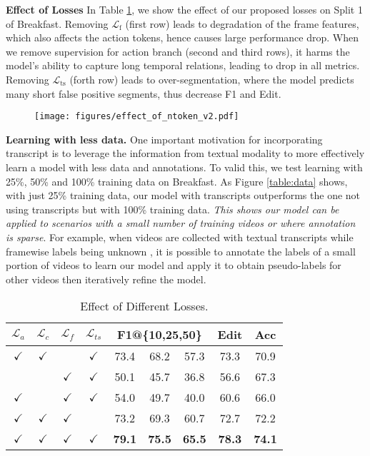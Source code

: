 \documentclass[10pt,twocolumn,letterpaper]{article}
\newcommand{\headline}[1]{\noindent \textbf{#1}}
\newcommand{\mL}{\mathcal{L}}
\newcommand{\0}{\boldsymbol{0}}
\begin{document}
\headline{Effect of Losses}
In Table \ref{table:losses}, we show the effect of our proposed losses on Split 1 of Breakfast. 
Removing $\mL_\text{f}$ (first row) leads to degradation of the frame features, which also affects the action tokens, hence causes large performance drop.  
When we remove supervision for action branch (second and third rows), it harms the model's ability to capture long temporal relations, leading to drop in all metrics.
Removing $\mL_\text{ts}$ (forth row) leads to over-segmentation, where the model predicts many short false positive segments, thus decrease F1 and Edit.



\begin{figure}
   \centering
   \texttt{[image: figures/effect\_of\_ntoken\_v2.pdf]}
   \label{fig:action-token}
\end{figure}

\headline{Learning with less data.}
One important motivation for incorporating transcript is to leverage the information from textual modality to more effectively learn a model with less data and annotations. To valid this, we test learning with 25\%, 50\% and 100\% training data on Breakfast. As Figure \ref{table:data} shows, with just 25\% training data, our model with transcripts outperforms the one not using transcripts but with 100\% training data. \emph{This shows our model can be applied to scenarios with a small number of training videos or where annotation is sparse}. 
For example, when videos are collected with textual transcripts while framewise labels being unknown \cite{Richard-Viterbi:CVPR18,Ding:CVPR18,Chang:CVPR19,Li:ICCV19,Lu:ICCV21,Souri:PAMI21}, it is possible to annotate the labels of a small portion of videos to learn our model and apply it to obtain pseudo-labels for other videos then iteratively refine the model.


\begin{table}
   \centering
    \small
   \begin{tabular}{|cccc|ccc|c|c|}
   \hline
   $\mL_a$ & $\mL_c$ & $\mL_f$ & $\mL_{ts}$ & \multicolumn{3}{c|}{F1@\{10,25,50\}} & Edit & Acc \\ \hline
$\checkmark$ & $\checkmark$ &  & $\checkmark$ & 73.4 & 68.2 & 57.3 & 73.3 & 70.9\\ \hline  & & $\checkmark$ & $\checkmark$ & 50.1 & 45.7 & 36.8 & 56.6 & 67.3 \\$\checkmark$ &  & $\checkmark$ & $\checkmark$ & 54.0 & 49.7 & 40.0 & 60.6 & 66.0 \\$\checkmark$ & $\checkmark$ & $\checkmark$ &  & 73.2& 69.3& 60.7& 72.7& 72.2  \\ \hline $\checkmark$ & $\checkmark$ & $\checkmark$ & $\checkmark$ & \textbf{79.1} & \textbf{75.5}& \textbf{65.5} & \textbf{78.3} & \textbf{74.1} \\ \hline
   \end{tabular}
   \vspace{1mm}
   \caption{\small Effect of Different Losses.}
   \label{table:losses}
\end{table}
\end{document}

